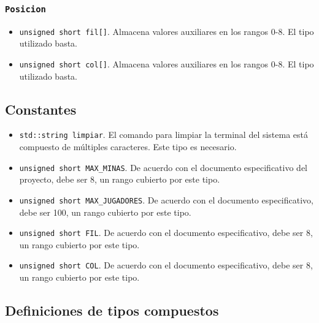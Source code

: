 \documentclass[12pt]{article}
\begin{document}
\subsubsection*{\texttt{Posicion}}

\begin{itemize}

\item \texttt{unsigned short fil[]}. Almacena valores auxiliares en los
rangos 0-8. El tipo utilizado basta.

\item \texttt{unsigned short col[]}. Almacena valores auxiliares en los
rangos 0-8. El tipo utilizado basta.

\end{itemize}

\subsection*{Constantes}

\begin{itemize}

\item \texttt{std::string limpiar}. El comando para limpiar la terminal
del sistema está compuesto de múltiples caracteres. Este tipo es necesario.

\item \texttt{unsigned short MAX_MINAS}. De acuerdo con el documento
especificativo del proyecto, debe ser 8, un rango cubierto por este tipo.

\item \texttt{unsigned short MAX_JUGADORES}. De acuerdo con el
documento especificativo, debe ser 100, un rango cubierto por este tipo.

\item \texttt{unsigned short FIL}. De acuerdo con el documento
especificativo, debe ser 8, un rango cubierto por este tipo.

\item \texttt{unsigned short COL}. De acuerdo con el documento
especificativo, debe ser 8, un rango cubierto por este tipo.

\end{itemize}

\subsection*{Definiciones de tipos compuestos}
\end{document}
